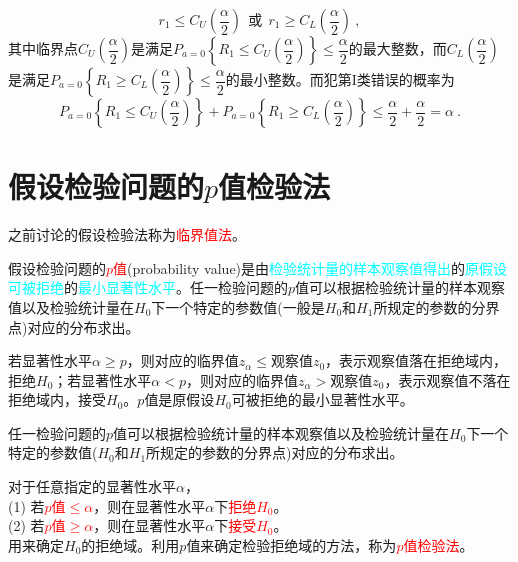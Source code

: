 \documentclass[12pt,a4paper]{article}
\begin{document}
\begin{equation*}
r_1 \leqslant C_U\left(\frac{\alpha}{2} \right) ~~\text{或}~~ r_1 \geqslant C_L\left(\frac{\alpha}{2} \right) ~,
\end{equation*}
其中临界点$C_U\left(\dfrac{\alpha}{2} \right)$是满足$P_{a=0}\left\{ R_1 \leqslant C_U\left(\dfrac{\alpha}{2} \right) \right\} \leqslant \dfrac{\alpha}{2}$的最大整数，而$C_L\left(\dfrac{\alpha}{2} \right)$是满足$P_{a=0}\left\{ R_1 \geqslant C_L\left(\dfrac{\alpha}{2} \right) \right\} \leqslant \dfrac{\alpha}{2}$的最小整数。而犯第I类错误的概率为
\begin{equation*}
P_{a=0}\left\{ R_1 \leqslant C_U\left(\dfrac{\alpha}{2} \right) \right\} +P_{a=0}\left\{ R_1 \geqslant C_L\left(\dfrac{\alpha}{2} \right) \right\} \leqslant \frac{\alpha}{2} +\frac{\alpha}{2} = \alpha ~.
\end{equation*}




\section{假设检验问题的$p$值检验法}
之前讨论的假设检验法称为\textcolor{red}{临界值法}。

假设检验问题的\textcolor{red}{$p$值}(probability value)是由\textcolor{cyan}{检验统计量的样本观察值得出}的\textcolor{cyan}{原假设可被拒绝}的\textcolor{cyan}{最小显著性水平}。任一检验问题的$p$值可以根据检验统计量的样本观察值以及检验统计量在$H_0$下一个特定的参数值(一般是$H_0$和$H_1$所规定的参数的分界点)对应的分布求出。

若显著性水平$\alpha \geqslant p$，则对应的临界值$z_\alpha \leqslant$观察值$z_0$，表示观察值落在拒绝域内，拒绝$H_0$；若显著性水平$\alpha < p$，则对应的临界值$z_\alpha >$观察值$z_0$，表示观察值不落在拒绝域内，接受$H_0$。$p$值是原假设$H_0$可被拒绝的最小显著性水平。

任一检验问题的$p$值可以根据检验统计量的样本观察值以及检验统计量在$H_0$下一个特定的参数值($H_0$和$H_1$所规定的参数的分界点)对应的分布求出。

对于任意指定的显著性水平$\alpha$，\\
(1) 若\textcolor{red}{$p$值$\leqslant \alpha$}，则在显著性水平$\alpha$下\textcolor{red}{拒绝$H_0$}。\\
(2) 若\textcolor{red}{$p$值$\geqslant \alpha$}，则在显著性水平$\alpha$下\textcolor{red}{接受$H_0$}。\\
用来确定$H_0$的拒绝域。利用$p$值来确定检验拒绝域的方法，称为\textcolor{red}{$p$值检验法}。
\end{document}
